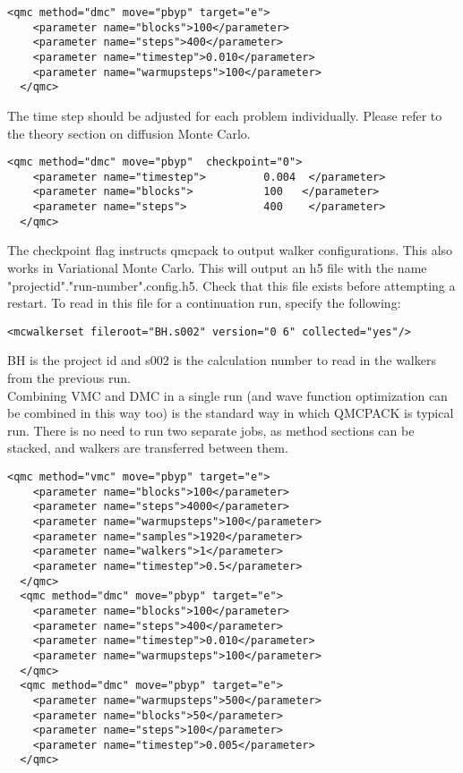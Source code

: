\begin{lstlisting}[caption=The following is an example of a very simple DMC section. ]
  <qmc method="dmc" move="pbyp" target="e">
    <parameter name="blocks">100</parameter>
    <parameter name="steps">400</parameter>
    <parameter name="timestep">0.010</parameter>
    <parameter name="warmupsteps">100</parameter>
  </qmc>
\end{lstlisting}
The time step should be adjusted for each problem individually.  Please refer to the theory section
on diffusion Monte Carlo.


\begin{lstlisting}[caption=The following is an example of running a simulation that can be restarted . ]
  <qmc method="dmc" move="pbyp"  checkpoint="0">
    <parameter name="timestep">         0.004  </parameter>
    <parameter name="blocks">           100   </parameter>
    <parameter name="steps">            400    </parameter>
  </qmc>
\end{lstlisting}
The checkpoint flag instructs qmcpack to output walker configurations.  This also
works in Variational Monte Carlo.  This will output an h5 file with the name "projectid"."run-number".config.h5.
Check that this file exists before attempting a restart.
To read in this file for a continuation run, specify the following:
\begin{lstlisting}[caption=Restart (read walkers from previous run) ]
 <mcwalkerset fileroot="BH.s002" version="0 6" collected="yes"/>
\end{lstlisting}
BH is the project id and s002 is the calculation number to read in the walkers from the previous run.\\

Combining VMC and DMC in a single run (and wave function optimization can be combined in this way too) is the standard way in which QMCPACK is typical run.   There is no need to run two separate jobs, as method sections can be stacked, and walkers are transferred between them.

\begin{lstlisting}[caption=Combined VMC and DMC run ]
  <qmc method="vmc" move="pbyp" target="e">
    <parameter name="blocks">100</parameter>
    <parameter name="steps">4000</parameter>
    <parameter name="warmupsteps">100</parameter>
    <parameter name="samples">1920</parameter>
    <parameter name="walkers">1</parameter>
    <parameter name="timestep">0.5</parameter>
  </qmc>
  <qmc method="dmc" move="pbyp" target="e">
    <parameter name="blocks">100</parameter>
    <parameter name="steps">400</parameter>
    <parameter name="timestep">0.010</parameter>
    <parameter name="warmupsteps">100</parameter>
  </qmc>
  <qmc method="dmc" move="pbyp" target="e">
    <parameter name="warmupsteps">500</parameter>
    <parameter name="blocks">50</parameter>
    <parameter name="steps">100</parameter>
    <parameter name="timestep">0.005</parameter>
  </qmc>
\end{lstlisting}




